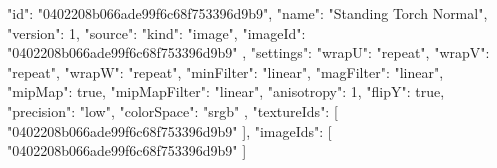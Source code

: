 {
  "id": "0402208b066ade99f6c68f753396d9b9",
  "name": "Standing Torch Normal",
  "version": 1,
  "source": {
    "kind": "image",
    "imageId": "0402208b066ade99f6c68f753396d9b9"
  },
  "settings": {
    "wrapU": "repeat",
    "wrapV": "repeat",
    "wrapW": "repeat",
    "minFilter": "linear",
    "magFilter": "linear",
    "mipMap": true,
    "mipMapFilter": "linear",
    "anisotropy": 1,
    "flipY": true,
    "precision": "low",
    "colorSpace": "srgb"
  },
  "textureIds": [
    "0402208b066ade99f6c68f753396d9b9"
  ],
  "imageIds": [
    "0402208b066ade99f6c68f753396d9b9"
  ]
}
